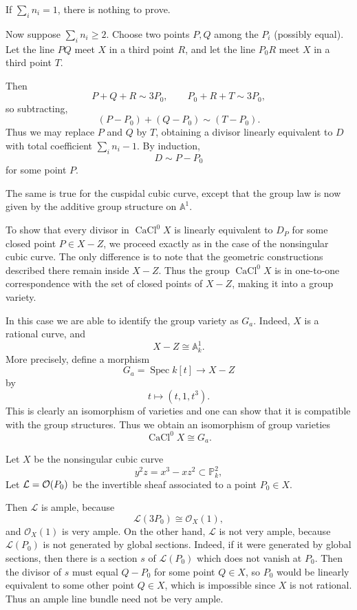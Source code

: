\documentclass[12pt]{article}
\begin{document}
\begin{example}
    If $\sum_i n_i = 1$, there is nothing to prove.

    Now suppose $\sum_i n_i \ge 2$. Choose two points $P, Q$ among the $P_i$ (possibly equal). Let the line $PQ$ meet $X$ in a third point $R$, and let the line $P_0R$ meet $X$ in a third point $T$.

    Then
    \[
        P + Q + R \sim 3P_0, \qquad P_0 + R + T \sim 3P_0,
    \]
    so subtracting,
    \[
        (P - P_0) + (Q - P_0) \sim (T - P_0).
    \]
    Thus we may replace $P$ and $Q$ by $T$, obtaining a divisor linearly equivalent to $D$ with total coefficient $\sum_i n_i - 1$. By induction,
    \[
        D \sim P - P_0
    \]
    for some point $P$.

    The same is true for the cuspidal cubic curve, except that the group law is now given by the additive group structure on $\mathbb{A}^1$.

    To show that every divisor in $\operatorname{CaCl}^0 X$ is linearly equivalent to $D_P$ for some closed point $P \in X - Z$, we proceed exactly as in the case of the nonsingular cubic curve. The only difference is to note that the geometric constructions described there remain inside $X - Z$. Thus the group $\operatorname{CaCl}^0 X$ is in one-to-one correspondence with the set of closed points of $X - Z$, making it into a group variety.

    In this case we are able to identify the group variety as $G_a$. Indeed, $X$ is a rational curve, and
    \[
        X - Z \cong \mathbb{A}^1_k.
    \]
    More precisely, define a morphism
    \[
        G_a = \operatorname{Spec} k[t] \to X - Z
    \]
    by
    \[
        t \mapsto (t,1,t^3).
    \]
    This is clearly an isomorphism of varieties and one can show that it is compatible with the group structures. Thus we obtain an isomorphism of group varieties
    \[
        \operatorname{CaCl}^0 X \cong G_a.
    \]
\end{example}

\begin{example}
    Let $X$ be the nonsingular cubic curve
    \[
        y^2 z = x^3 - x z^2
        \subset \mathbb P^2_k,
    \] Let $\mathcal L = {\mathcal{O}}(P_0)$ be the invertible sheaf associated to a point $P_0 \in X$.

    Then $\mathcal L$ is ample, because
    \[
        \mathcal L(3P_0) \cong \mathcal O_X(1),
    \]
    and $\mathcal O_X(1)$ is very ample. On the other hand, $\mathcal L$ is not very ample, because $\mathcal L(P_0)$ is not generated by global sections. Indeed, if it were generated by global sections, then there is a section $s$ of $\mathcal L(P_0)$ which does not vanish at $P_0$. Then the divisor of $s$ must equal $Q - P_0$ for some point $Q \in X$, so $P_0$ would be linearly equivalent to some other point $Q \in X$, which is impossible since $X$ is not rational. Thus an ample line bundle need not be very ample.
\end{example}
\end{document}
